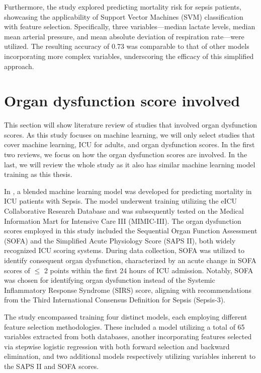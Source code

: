 \documentclass[12pt,a4paper,english
]{tunithesis}
\begin{document}
Furthermore, the study explored predicting mortality risk for sepsis patients, showcasing the applicability of Support Vector Machines (SVM) classification with feature selection. Specifically, three variables—median lactate levels, median mean arterial pressure, and mean absolute deviation of respiration rate—were utilized. The resulting accuracy of 0.73 was comparable to that of other models incorporating more complex variables, underscoring the efficacy of this simplified approach.

 

\section{Organ dysfunction score involved}
This section will show literature review of studies that involved organ dysfunction scores. As this study focuses on machine learning, we will only select studies that cover machine learning, ICU for adults, and organ dysfunction scores. In the first two reviews, we focus on how the organ dysfunction scores are involved. In the last, we will review the whole study as it also has similar machine learning model training as this thesis.

In \textcite{zeng2021}, a blended machine learning model was developed for predicting mortality in ICU patients with Sepsis. The model underwent training utilizing the eICU Collaborative Research Database and was subsequently tested on the Medical Information Mart for Intensive Care III (MIMIC-III). The organ dysfunction scores employed in this study included the Sequential Organ Function Assessment (SOFA) and the Simplified Acute Physiology Score (SAPS II), both widely recognized ICU scoring systems. During data collection, SOFA was utilized to identify consequent organ dysfunction, characterized by an acute change in SOFA scores of $\leq$ 2 points within the first 24 hours of ICU admission. Notably, SOFA was chosen for identifying organ dysfunction instead of the Systemic Inflammatory Response Syndrome (SIRS) score, aligning with recommendations from the Third International Consensus Definition for Sepsis (Sepsis-3).

The study encompassed training four distinct models, each employing different feature selection methodologies. These included a model utilizing a total of 65 variables extracted from both databases, another incorporating features selected via stepwise logistic regression with both forward selection and backward elimination, and two additional models respectively utilizing variables inherent to the SAPS II and SOFA scores.
\end{document}
